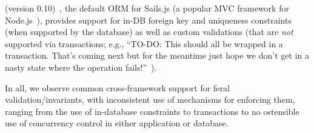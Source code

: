  (version 0.10)~\cite{code-waterline}, the default ORM
for Sails.js (a popular MVC framework for Node.js~\cite{code-sails}),
provides support for in-DB foreign key and uniqueness constraints
(when supported by the database) as well as custom validations (that
are \textit{not} supported via transactions; e.g., ``TO-DO: This
should all be wrapped in a transaction. That's coming next but for the
meantime just hope we don't get in a nasty state where the operation
fails!''~\cite{code-waterline-txn}).

 In all, we observe common cross-framework support
for feral validation/invariants, with inconsistent use of mechanisms
for enforcing them, ranging from the use of in-database constraints to
transactions to no ostensible use of concurrency control in either
application or database.


